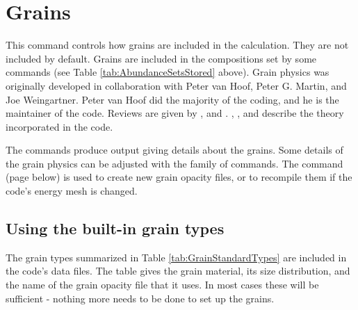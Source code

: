 \section{Grains}
\label{sec:GrainsCommand}

This command controls how grains are included in the calculation.
They are not included by default.
Grains are included in the compositions set
by some  commands
(see Table \ref{tab:AbundanceSetsStored} above).
Grain physics
was originally developed in collaboration with
Peter van Hoof, Peter G. Martin, and
Joe Weingartner. Peter van Hoof did the majority of the coding,
and he is the maintainer of the code.
Reviews are given by \citet{Spitzer1948,Spitzer1978}, and \citet{Martin1979}.
\citet{Baldwin1991},
\citet{Weingartner2001b}, \citet{VanHoof2004} and
\citet{Weingartner2006} describe the theory incorporated in the code.

The  commands produce
output giving details about the grains.
Some details of the grain physics
can be adjusted with the  family of commands.
The  command
(page \pageref{sec:CompileGrains} below) is used to 
create new grain opacity files, or to recompile them if
the code's energy mesh is changed.

\subsection{Using the built-in grain types}

The grain types summarized in Table \ref{tab:GrainStandardTypes} are
included in the code's data files.
The table gives the grain material, its size distribution,
and the name of the grain opacity file that it uses.
In most cases these
will be sufficient - nothing more needs to be done to set up the grains.

